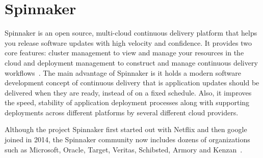 \section{Spinnaker}

Spinnaker is an open source, multi-cloud continuous delivery platform
that helps you release software updates with high velocity and
confidence.  It provides two core features: cluster management to view
and manage your resources in the cloud and deployment management to
construct and manage continuous delivery
workflows~\cite{hid-sp18-602-www-spinnaker-io}. The main advantage of
Spinnaker is it holds a modern software development concept of
continuous delivery that is application updates should be delivered
when they are ready, instead of on a fixed schedule.  Also, it
improves the speed, stability of application deployment processes
along with supporting deployments across different platforms by
several different cloud providers.

Although the project Spinnaker first started out with Netflix and then
google joined in 2014, the Spinnaker community now includes dozens of
organizations such as Microsoft, Oracle, Target, Veritas,
Schibsted, Armory and Kenzan~\cite{hid-sp18-602-www-spinnaker-gc}.

